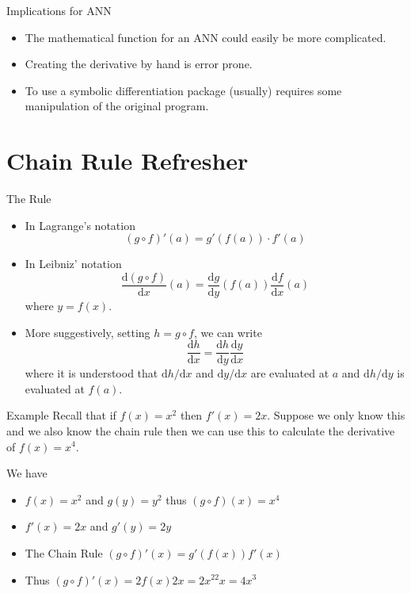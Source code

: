 \documentclass{beamer}
\begin{document}
\begin{frame}[fragile]{Implications for ANN}
\begin{itemize}
\item The mathematical function for an ANN could easily be more
  complicated.
\item Creating the derivative by hand is error prone.
\item To use a symbolic differentiation package (usually) requires
  some manipulation of the original program.
\end{itemize}
\end{frame}

\section{Chain Rule Refresher}

\begin{frame}[fragile]{The Rule}
\begin{itemize}
\item
In Lagrange's notation
$$
(g \circ f)'(a) = g'(f(a))\cdot f'(a)
$$
\item
In Leibniz' notation
$$
\frac{\mathrm{d} (g \circ f)}{\mathrm{d} x}(a) =
\frac{\mathrm{d} g}{\mathrm{d} y}(f(a)) \frac{\mathrm{d} f}{\mathrm{d} x}(a)
$$
where $y = f(x)$.
\item
More suggestively, setting $h = g \circ f$, we can write
$$
\frac{\mathrm{d} h}{\mathrm{d} x} =
\frac{\mathrm{d} h}{\mathrm{d} y} \frac{\mathrm{d} y}{\mathrm{d} x}
$$
where it is understood that $\mathrm{d} h / \mathrm{d} x$ and
$\mathrm{d} y / \mathrm{d} x$ are evaluated at $a$ and $\mathrm{d} h /
\mathrm{d} y$ is evaluated at $f(a)$.
\end{itemize}
\end{frame}

\begin{frame}[fragile]{Example}
Recall that if $f(x) = x^2$ then $f'(x) = 2x$. Suppose we only know
this and we also know the chain rule then we can use this to calculate
the derivative of $f(x) = x^4$.

We have
\begin{itemize}
\item
$f(x) = x^2$ and $g(y) = y^2$ thus $(g \circ f)(x) = x^4$
\item
$f'(x) = 2x$ and $g'(y) = 2y$
\item
The Chain Rule $(g \circ f)'(x) = g'(f(x))f'(x)$
\item
Thus $(g \circ f)'(x) = 2f(x)2x = 2x^22x = 4x^3$
\end{itemize}
\end{frame}
\end{document}
